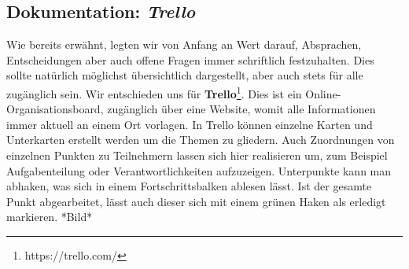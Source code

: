\subsection{Dokumentation: \textit{Trello}}
Wie bereits erwähnt, legten wir von Anfang an Wert darauf, Absprachen, Entscheidungen aber auch offene Fragen immer schriftlich festzuhalten. Dies sollte natürlich möglichst übersichtlich dargestellt, aber auch stets für alle zugänglich sein. Wir entschieden uns für \textbf{Trello}\footnote[1]{https://trello.com/}. Dies ist ein Online-Organisationsboard, zugänglich über eine Website, womit alle Informationen immer aktuell an einem Ort vorlagen. In Trello können einzelne Karten und Unterkarten erstellt werden um die Themen zu gliedern. Auch Zuordnungen von einzelnen Punkten zu Teilnehmern lassen sich hier realisieren um, zum Beispiel Aufgabenteilung oder Verantwortlichkeiten aufzuzeigen. Unterpunkte kann man abhaken, was sich in einem Fortschrittsbalken ablesen lässt. Ist der gesamte Punkt abgearbeitet, lässt auch dieser sich mit einem grünen Haken als erledigt markieren.
*Bild*